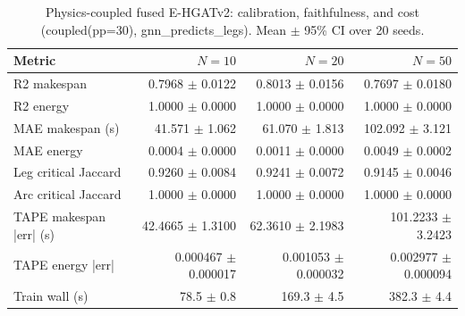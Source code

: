 \begin{table}[t]
\centering
\caption{Physics-coupled fused E-HGATv2: calibration, faithfulness, and cost (coupled(pp=30), gnn_predicts_legs). Mean $\pm$ 95\% CI over 20 seeds.}
\label{tab:fused-coupled}
\begin{tabular}{lrrr}
\toprule
Metric & $N=10$ & $N=20$ & $N=50$ \\
\midrule
R2 makespan & 0.7968 $\pm$ 0.0122 & 0.8013 $\pm$ 0.0156 & 0.7697 $\pm$ 0.0180 \\
R2 energy & 1.0000 $\pm$ 0.0000 & 1.0000 $\pm$ 0.0000 & 1.0000 $\pm$ 0.0000 \\
MAE makespan (s) & 41.571 $\pm$ 1.062 & 61.070 $\pm$ 1.813 & 102.092 $\pm$ 3.121 \\
MAE energy & 0.0004 $\pm$ 0.0000 & 0.0011 $\pm$ 0.0000 & 0.0049 $\pm$ 0.0002 \\
Leg critical Jaccard & 0.9260 $\pm$ 0.0084 & 0.9241 $\pm$ 0.0072 & 0.9145 $\pm$ 0.0046 \\
Arc critical Jaccard & 1.0000 $\pm$ 0.0000 & 1.0000 $\pm$ 0.0000 & 1.0000 $\pm$ 0.0000 \\
TAPE makespan |err| (s) & 42.4665 $\pm$ 1.3100 & 62.3610 $\pm$ 2.1983 & 101.2233 $\pm$ 3.2423 \\
TAPE energy |err| & 0.000467 $\pm$ 0.000017 & 0.001053 $\pm$ 0.000032 & 0.002977 $\pm$ 0.000094 \\
Train wall (s) & 78.5 $\pm$ 0.8 & 169.3 $\pm$ 4.5 & 382.3 $\pm$ 4.4 \\
\bottomrule
\end{tabular}
\end{table}
